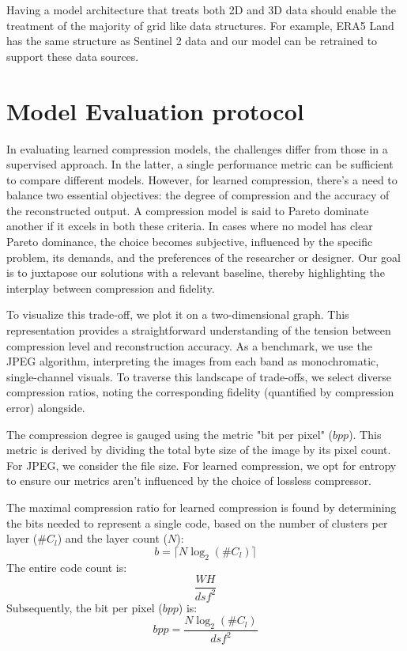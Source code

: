 \documentclass[runningheads]{llncs}
\begin{document}
Having a model architecture that treats both 2D and 3D data should enable the treatment of the 
majority of grid like data structures. For example, ERA5 Land has the same structure as Sentinel 2 data 
and our model can be retrained to support these data sources. 
\section{Model Evaluation protocol} 
 
In evaluating learned compression models, the challenges differ from those in a supervised approach. 
In the latter, a single performance metric can be sufficient to compare different models. However, for 
learned compression, there's a need to balance two essential objectives: the degree of compression 
and the accuracy of the reconstructed output. A compression model is said to Pareto dominate 
another if it excels in both these criteria. In cases where no model has clear Pareto dominance, the 
choice becomes subjective, influenced by the specific problem, its demands, and the preferences of 
the researcher or designer. Our goal is to juxtapose our solutions with a relevant baseline, thereby 
highlighting the interplay between compression and fidelity. 
 
 
To visualize this trade-off, we plot it on a two-dimensional graph. This representation provides a 
straightforward understanding of the tension between compression level and reconstruction 
accuracy. As a benchmark, we use the JPEG algorithm, interpreting the images from each band as 
monochromatic, single-channel visuals. To traverse this landscape of trade-offs, we select diverse 
compression ratios, noting the corresponding fidelity (quantified by compression error) alongside. 
 
The compression degree is gauged using the metric "bit per pixel" ($bpp$). This metric is derived by 
dividing the total byte size of the image by its pixel count. For JPEG, we consider the file size. For 
learned compression, we opt for entropy to ensure our metrics aren't influenced by the choice of 
lossless compressor. 
 
The maximal compression ratio for learned compression is found by determining the bits needed to 
represent a single code, based on the number of clusters per layer ($\#C_l$) and the layer count ($N$):
\begin{equation}
b = \lceil N \log_2(\#C_l)\rceil
\end{equation}
The entire code count is:
\begin{equation}
\frac{WH}{dsf^2}
\end{equation}
Subsequently, the bit per pixel ($bpp$) is:
\begin{equation}
bpp=\frac{N\log_2(\#C_l)}{dsf^2}
\end{equation}
 
\end{document}
